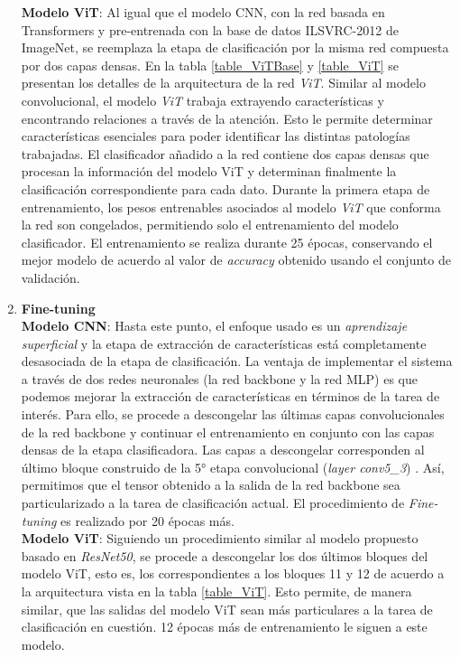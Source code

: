 \begin{enumerate}
        \textbf{Modelo ViT}: Al igual que el modelo CNN, con la red basada en Transformers y pre-entrenada con la
        base de datos ILSVRC-2012 de ImageNet, se reemplaza la etapa de clasificación por la misma red compuesta
        por dos capas densas. En la tabla \ref{table_ViTBase} y \ref{table_ViT} se presentan los detalles de la
        arquitectura de la red \textit{ViT}. Similar al modelo convolucional, el modelo \textit{ViT} trabaja
        extrayendo características y encontrando relaciones a través de la atención. Esto le permite determinar
        características esenciales para poder identificar las distintas patologías trabajadas. El clasificador
        añadido a la red contiene dos capas densas que procesan la información del modelo ViT y determinan
        finalmente la clasificación correspondiente para cada dato. Durante la primera etapa de entrenamiento,
        los pesos entrenables asociados al modelo \textit{ViT} que conforma la red son congelados, permitiendo
        solo el entrenamiento del modelo clasificador. El entrenamiento se realiza durante 25 épocas,
        conservando el mejor modelo de acuerdo al valor de \textit{accuracy} obtenido usando el conjunto de
        validación.


    \item \textbf{Fine-tuning}\\
        \textbf{Modelo CNN}: Hasta este punto, el enfoque usado es un \textit{aprendizaje superficial} y la
        etapa de extracción de características está completamente desasociada de la etapa de clasificación. La
        ventaja de implementar el sistema a través de dos redes neuronales (la red backbone y la red MLP) es que
        podemos mejorar la extracción de características en términos de la tarea de interés. Para ello, se procede
        a descongelar las últimas capas convolucionales de la red backbone y continuar el entrenamiento en conjunto
        con las capas densas de la etapa clasificadora. Las capas a descongelar corresponden al último bloque
        construido de la 5° etapa convolucional (\textit{layer conv5\_3}) \cite{he2016deep}. Así, permitimos que el
        tensor obtenido a la salida de la red backbone sea particularizado a la tarea de clasificación actual. El
        procedimiento de \textit{Fine-tuning} es realizado por 20 épocas más.\\

        \textbf{Modelo ViT}: Siguiendo un procedimiento similar al modelo propuesto basado en \textit{ResNet50}, se
        procede a descongelar los dos últimos bloques del modelo ViT, esto es, los correspondientes a los bloques 11
        y 12 de acuerdo a la arquitectura vista en la tabla \ref{table_ViT}. Esto permite, de manera similar, que las
        salidas del modelo ViT sean más particulares a la tarea de clasificación en cuestión. 12 épocas más de
        entrenamiento le siguen a este modelo.



\end{enumerate}
